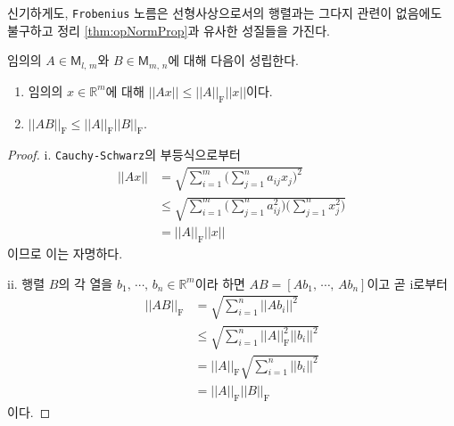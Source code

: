 신기하게도, \texttt{Frobenius} 노름은 선형사상으로서의 행렬과는 그다지 관련이 없음에도 불구하고 정리 \ref{thm:opNormProp}과 유사한 성질들을 가진다.

\begin{theorem}
    임의의 $A\in\mathsf{M}_{l,\,m}$와 $B\in\mathsf{M}_{m,\,n}$에 대해 다음이 성립한다.
    \begin{enumerate}
        \item 임의의 $x\in\mathbb{R}^m$에 대해 $||Ax||\leq||A||_\mathrm{F}||x||$이다.
        \item $||AB||_\mathrm{F}\leq||A||_\mathrm{F}||B||_\mathrm{F}$.
    \end{enumerate}
\end{theorem}

\begin{proof}
    i. \texttt{Cauchy-Schwarz}의 부등식으로부터
    \begin{align*}
        ||Ax||&=\sqrt{\sum_{i=1}^m\bigg(\sum_{j=1}^na_{ij}x_j\bigg)^2}\\
        &\leq\sqrt{\sum_{i=1}^m\bigg(\sum_{j=1}^na_{ij}^2\bigg)\bigg(\sum_{j=1}^nx_j^2\bigg)}\\
        &=||A||_\mathrm{F}||x||
    \end{align*}
    이므로 이는 자명하다.

    ii. 행렬 $B$의 각 열을 $b_1,\,\cdots,\,b_n\in\mathbb{R}^m$이라 하면 $AB=[Ab_1,\,\cdots,\,Ab_n]$이고 곧 i로부터
    \begin{align*}
        ||AB||_\mathrm{F}&=\sqrt{\sum_{i=1}^n||Ab_i||^2}\\
        &\leq\sqrt{\sum_{i=1}^n||A||_\mathrm{F}^2||b_i||^2}\\
        &=||A||_\mathrm{F}\sqrt{\sum_{i=1}^n||b_i||^2}\\
        &=||A||_\mathrm{F}||B||_\mathrm{F}
    \end{align*}
    이다.
\end{proof}